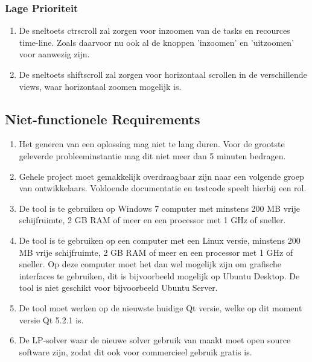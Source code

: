 \subsubsection*{Lage Prioriteit}
\begin{enumerate}[resume]
    \item De sneltoets ctr\plus  scroll zal zorgen voor inzoomen van de tasks en recources time-line. Zoals daarvoor nu ook al de knoppen 'inzoomen' en 'uitzoomen' voor aanwezig zijn. 
    \item De sneltoets shift\plus scroll zal zorgen voor horizontaal scrollen in de verschillende views, waar horizontaal zoomen mogelijk is.
\end{enumerate}

\subsection{Niet-functionele Requirements}
\begin{enumerate}
    \item Het generen van een oplossing mag niet te lang duren. Voor de grootste geleverde probleeminstantie mag dit niet meer dan 5 minuten bedragen.
    \item Gehele project moet gemakkelijk overdraagbaar zijn naar een volgende groep van ontwikkelaars. Voldoende documentatie en testcode speelt hierbij een rol.
    \item De tool is te gebruiken op Windows 7 computer met minstens 200 MB vrije schijfruimte, 2 GB RAM of meer en een processor met 1 GHz of sneller.
    \item De tool is te gebruiken op een computer met een Linux versie, minstens 200 MB vrije schijfruimte, 2 GB RAM of meer en een processor met 1 GHz of sneller. Op deze computer moet het dan wel mogelijk zijn om grafische interfaces te gebruiken, dit is bijvoorbeeld mogelijk op Ubuntu Desktop. De tool is niet geschikt voor bijvoorbeeld Ubuntu Server. 
    \item De tool moet werken op de nieuwste huidige Qt versie, welke op dit moment versie Qt 5.2.1 is.
    \item De LP-solver waar de nieuwe solver gebruik van maakt moet open source software zijn, zodat dit ook voor commercieel gebruik gratis is. 
\end{enumerate}
